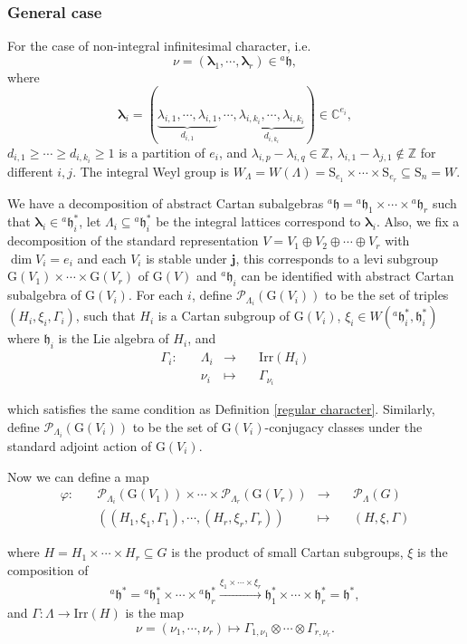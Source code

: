 \documentclass[12pt, a4paper]{amsart}
\numberwithin{equation}{section}
\newcommand{\blam}{{\boldsymbol{\lambda}}}
\newcommand{\BC}{{\mathbb {C}}}
\newcommand{\BZ}{{\mathbb {Z}}}
\newcommand{\CP}{{\mathcal {P}}}
\newcommand{\fh}{\mathfrak{h}}
\newcommand{\G}{{\mathrm{G}}}
\newcommand{\Irr}{{\mathrm{Irr}}}
\newcommand{\defmap}[5]{
           \begin{equation*}
              \begin{aligned}
                   #1:\quad  & #2 &\longrightarrow &\quad #3 \\
                      \quad  & #4    &\longmapsto  &\quad #5
              \end{aligned}
           \end{equation*}
          }
\begin{document}
\subsubsection{General case}
For the case of non-integral infinitesimal character, i.e. 
$$\nu = (\blam_1, \cdots, \blam_r) \in {^{a}\fh},$$ 
where 
$$\blam_i = (\underbrace{\lambda_{i,1}, \cdots, \lambda_{i,1}}_{d_{i,1}},\cdots,\underbrace{\lambda_{i,k_i},\cdots,\lambda_{i,k_i}}_{d_{i,k_i}}) \in \BC^{e_i},$$  $d_{i,1} \geq \cdots \geq d_{i,k_i} \geq 1$ is a partition of $e_i$, and $\lambda_{i,p} - \lambda_{i,q} \in \BZ$, $\lambda_{i,1} - \lambda_{j,1} \notin \BZ$ for different $i,j$. The integral Weyl group is $W_{\Lambda} = W(\Lambda) = \mathrm{S}_{e_1} \times \cdots \times \mathrm{S}_{e_r} \subseteq \mathrm{S}_{n} = W$. 

We have a decomposition of abstract Cartan subalgebras $^{a}\fh = {^{a}\fh_1} \times \cdots \times {^{a}\fh_r}$ such that $\blam_i \in {^{a}\fh_i^*}$, let $\Lambda_i \subseteq {^{a}\fh_i^*}$ be the integral lattices correspond to $\blam_i$. Also, we fix a decomposition of the standard representation $V = V_1 \oplus V_2 \oplus \cdots \oplus V_r$ with $\dim V_i = e_i$ and each $V_i$ is stable under $\mathbf{j}$, this corresponds to a levi subgroup $\G(V_1) \times \cdots \times \G(V_r)$ of $\G(V)$ and $^{a}\fh_i$ can be identified with abstract Cartan subalgebra of $\G(V_i)$. For each $i$, define $\mathscr{P}_{\Lambda_i}(\G(V_i))$ to be the set of triples $(H_i, \xi_i, \Gamma_i)$, such that $H_i$ is a Cartan subgroup of $\G(V_i)$, $\xi_i \in W({^{a}\fh_i^*},\fh_i^*)$ where $\fh_i$ is the Lie algebra of $H_i$, and \defmap{\Gamma_i}{\Lambda_i}{\Irr(H_i)}{\nu_i}{\Gamma_{\nu_i}}
which satisfies the same condition as Definition \ref{regular character}. Similarly, define $\CP_{\Lambda_i}(\G(V_i))$ to be the set of $\G(V_i)$-conjugacy classes under the standard adjoint action of $\G(V_i)$.

Now we can define a map \defmap{\varphi}{\CP_{\Lambda_i}(\G(V_1)) \times \cdots \times \CP_{\Lambda_r}(\G(V_r))}{\CP_{\Lambda}(G)}{((H_1,\xi_1,\Gamma_1),\cdots,(H_r,\xi_r,\Gamma_r))}{(H,\xi,\Gamma)}
where $H = H_1 \times \cdots \times H_r \subseteq G$ is the product of small Cartan subgroups, $\xi$ is the composition of
\[
    ^{a}\fh^*={^{a}\fh}_1^*\times \cdots \times  {^{a}\fh}_{r}^* \xrightarrow{\xi_1 \times \cdots \times \xi_r} \fh_1^* \times \cdots \times \fh_r^* = \fh^*,
\]
and $\Gamma: \Lambda \to \Irr(H)$ is the map
$$\nu = (\nu_1,\cdots ,\nu_r) \mapsto \Gamma_{1,\nu_1} \otimes \cdots \otimes \Gamma_{r,\nu_r}.$$
\end{document}
